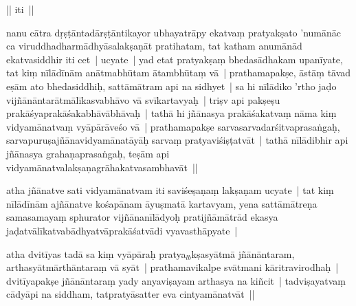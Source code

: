 \documentclass[article,12pt,a4paper]{memoir}%
\newcounter{parCount}
\begin{document}
	  
	  

	  
	  \pstart \leavevmode%
	|| iti ||
	{}
	\pend%
      

	  
	  \pstart \leavevmode%
	\label{thakur75-141.30}nanu cātra dṛṣṭāntadārṣṭāntikayor ubhayatrāpy ekatvaṃ pratyakṣato 'numānāc ca viruddhadharmādhyāsalakṣaṇāt pratihatam, tat katham anumānād ekatvasiddhir iti cet | ucyate | yad etat pratyakṣaṃ bhedasādhakam upanīyate, tat kiṃ nīlādīnām anātmabhūtam ātambhūtaṃ vā | prathamapakṣe, āstāṃ tāvad eṣām ato bhedasiddhiḥ, \leavevmode{}\label{RNAms_76a} sattāmātram api na sidhyet | sa hi nīlādiko 'rtho jaḍo vijñānāntarātmālīkasvabhāvo vā svīkartavyaḥ | triṣv api pakṣeṣu prakāśyaprakāśakabhāvābhāvaḥ | tathā hi jñānasya prakāśakatvaṃ nāma kiṃ vidyamānatvaṃ vyāpārāveśo vā | prathamapakṣe sarvasarvadarśitvaprasaṅgaḥ, sarvapuruṣajñānavidyamānatāyāḥ sarvaṃ pratyaviśiṣṭatvāt | tathā nīlādibhir api jñānasya grahaṇaprasaṅgaḥ, teṣām api vidyamānatvalakṣaṇagrāhakatvasambhavāt ||
	{}
	\pend%
      

	  
	  \pstart \leavevmode%
	\label{thakur75-142.7}atha jñānatve sati vidyamānatvam iti saviśeṣaṇaṃ lakṣaṇam ucyate | tat kiṃ nīlādīnām ajñānatve kośapānam āyuṣmatā kartavyam, yena sattāmātreṇa samasamayaṃ sphurator vijñānanīlādyoḥ pratijñāmātrād ekasya jaḍatvālīkatvabādhyatvāprakāśatvādi vyavasthāpyate |
	{}
	\pend%
      

	  
	  \pstart \leavevmode%
	\label{thakur75-142.11}atha dvitīyas tadā sa kiṃ vyāpāraḥ pratya{\tiny $_{lb}$}\label{RNAms_76a3}kṣasyātmā jñānāntaram, arthasyātmārthāntaraṃ vā syāt | prathamavikalpe svātmani kāritravirodhaḥ | dvitīyapakṣe jñānāntaraṃ yady anyaviṣayam arthasya na kiñcit | tadviṣayatvaṃ cādyāpi na siddham, tatpratyāsatter eva cintyamānatvāt ||
	{}
	\pend%
      
\end{document}

